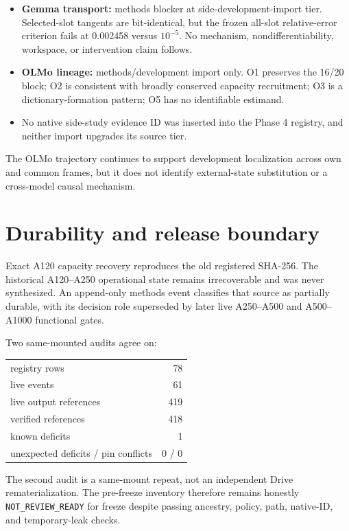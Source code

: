 \documentclass[10pt]{article}
\begin{document}
\begin{itemize}
\item \textbf{Gemma transport:} methods blocker at side-development-import
tier. Selected-slot tangents are bit-identical, but the frozen all-slot
relative-error criterion fails at 0.002458 versus $10^{-5}$. No mechanism,
nondifferentiability, workspace, or intervention claim follows.
\item \textbf{OLMo lineage:} methods/development import only. O1 preserves the
16/20 block; O2 is consistent with broadly conserved capacity recruitment;
O3 is a dictionary-formation pattern; O5 has no identifiable estimand.
\item No native side-study evidence ID was inserted into the Phase 4 registry,
and neither import upgrades its source tier.
\end{itemize}

The OLMo trajectory continues to support development localization across own
and common frames, but it does not identify external-state substitution or a
cross-model causal mechanism.

\section{Durability and release boundary}

Exact A120 capacity recovery reproduces the old registered SHA-256. The
historical A120--A250 operational state remains irrecoverable and was never
synthesized. An append-only methods event classifies that source as partially
durable, with its decision role superseded by later live A250--A500 and
A500--A1000 functional gates.

Two same-mounted audits agree on:

\begin{center}\small
\begin{tabular}{lr}
\toprule
registry rows & 78\\
live events & 61\\
live output references & 419\\
verified references & 418\\
known deficits & 1\\
unexpected deficits / pin conflicts & 0 / 0\\
\bottomrule
\end{tabular}
\end{center}

The second audit is a same-mount repeat, not an independent Drive
rematerialization. The pre-freeze inventory therefore remains honestly
\texttt{NOT\_REVIEW\_READY} for freeze despite passing ancestry, policy, path,
native-ID, and temporary-leak checks.
\end{document}
